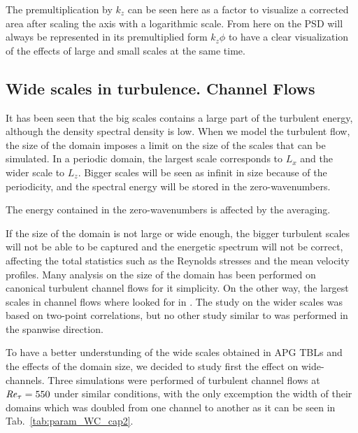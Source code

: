The premultiplication by $k_z$ can be seen here as a factor to visualize a corrected area after scaling the axis with a logarithmic scale.
From here on the PSD will always be represented in its premultiplied form $k_z\phi$ to have a clear visualization of the effects of large and small scales at the same time.

\subsection{Wide scales in turbulence. Channel Flows}
It has been seen that the big scales contains a large part of the turbulent energy, although the density spectral density is low.
When we model the turbulent flow, the size of the domain imposes a limit on the size of the scales that can be simulated. In a periodic domain, the largest scale corresponds to $L_x$ and the wider scale to $L_z$. Bigger scales will be seen as infinit in size because of the periodicity, and the spectral energy will be stored in the zero-wavenumbers.

The energy contained in the zero-wavenumbers is affected by the averaging.

If the size of the domain is not large or wide enough, the bigger turbulent scales will not be able to be captured and the energetic spectrum will not be correct, affecting the total statistics such as the Reynolds stresses and the mean velocity profiles.
Many analysis on the size of the domain has been performed on canonical turbulent channel flows for it simplicity.
On the other way, the largest scales in channel flows where looked for in .
The study on the wider scales was based on two-point correlations, but no other study similar to  was performed in the spanwise direction.

To have a better understunding of the wide scales obtained in APG TBLs and the effects of the domain size, we decided to study first the effect on wide-channels.
Three simulations were performed of turbulent channel flows at $\mbox{\textit{Re}}_{\tau} = 550 $ under similar conditions, with the only excemption the width of their domains which was doubled from one channel to another as it can be seen in Tab.~\ref{tab:param_WC_cap2}.
 
